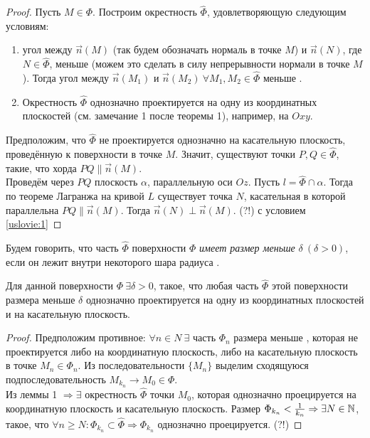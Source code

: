 \documentclass[a4paper,10pt]{article}
\begin{document}
	\begin{proof}
		Пусть $M \in \Phi$. Построим окрестность $\widehat{\Phi}$, удовлетворяющую следующим условиям:
		\begin{enumerate}[label=\arabic*)]
			\item угол между $\vec{n}(M)$ (так будем обозначать нормаль в точке $M$) и $\vec{n}(N)$, где $N \in \widehat{\Phi} $, меньше  (можем это сделать в силу непрерывности нормали в точке $M$). Тогда угол между $\vec{n}(M_1)$ и $\vec{n}(M_2) ~ \forall M_1, M_2 \in \widehat{\Phi}$ меньше .
			\item Окрестность $\widehat{\Phi}$ однозначно проектируется на одну из координатных плоскостей (см. замечание 1 после теоремы 1), например, на $Oxy$.
		\end{enumerate}
		Предположим, что $\widehat{\Phi}$ не проектируется однозначно на касательную плоскость, проведённую к поверхности в точке $M$. Значит, существуют точки $P, Q \in \widehat{\Phi}$, такие, что хорда $PQ \parallel \vec{n}(M)$. \\
		Проведём через $PQ$ плоскость $\alpha$, параллельную оси $Oz$. Пусть $l=\widehat{\Phi} \cap \alpha$. Тогда по теореме Лагранжа на кривой $L$ существует точка $N$, касательная в которой параллельна $PQ \parallel \vec{n}(M)$. Тогда $\vec{n}(N) \perp \vec{n}(M)$. (?!) с условием \ref{uslovie:1}
	\end{proof}
	
	\begin{defn}
		Будем говорить, что часть $\widehat{\Phi}$ поверхности $\Phi$ \textit{имеет размер меньше} $\delta ~ (\delta > 0)$, если он лежит внутри некоторого шара радиуса .
	\end{defn}
	
	\begin{lem}
		Для данной поверхности $\Phi ~ \exists \delta > 0$, такое, что любая часть $\widehat{\Phi}$ этой поверхности размера меньше $\delta$ однозначно проектируется на одну из координатных плоскостей и на касательную плоскость.
	\end{lem}
	
	\begin{proof}
		Предположим противное: $\forall n \in N ~ \exists$ часть $\Phi_n$ размера меньше , которая не проектируется либо на координатную плоскость, либо на касательную плоскость в точке $M_n \in \Phi_n$. Из последовательности $\{M_n\}$ выделим сходящуюся подпоследовательность $M_{k_n} \to M_0 \in \Phi$. \\
		Из леммы 1 $\Rightarrow \exists$ окрестность $\widehat{\Phi}$ точки $M_0$, которая однозначно проецируется на координатную плоскость и касательную плоскость. Размер $\Phi_{k_n} < \frac{1}{k_n} \Rightarrow \exists N \in {\mathbb N}$, такое, что $\forall n \ge N : \Phi_{k_n} \subset \widehat{\Phi} \Rightarrow \Phi_{k_n}$ однозначно проецируется. (?!)
	\end{proof}
	
\end{document}
